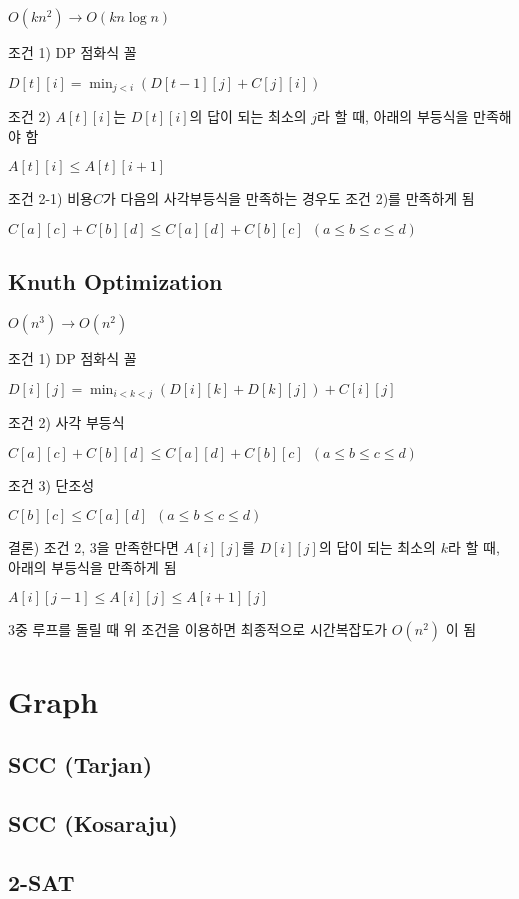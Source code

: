 \documentclass[10pt,landscape,a4paper,twocolumn]{article}
\begin{document}
$O(kn^{2}) \to O(kn\log{n})$

조건 1) DP 점화식 꼴

$D[t][i] = \min_{j<i}( D[t-1][j] + C[j][i] )$

조건 2) $A[t][i]$는 $D[t][i]$의 답이 되는 최소의 $j$라 할 때, 아래의 부등식을 만족해야 함

$A[t][i] \leq A[t][i+1]$

조건 2-1) 비용$C$가 다음의 사각부등식을 만족하는 경우도 조건 2)를 만족하게 됨

$C[a][c] + C[b][d] \leq C[a][d] + C[b][c] \phantom{1} (a \leq b \leq c \leq d)$

\subsection{Knuth Optimization}

$O(n^{3}) \to O(n^{2})$

조건 1) DP 점화식 꼴

$D[i][j] = \min_{i<k<j}( D[i][k] + D[k][j] ) + C[i][j]$

조건 2) 사각 부등식

$C[a][c] + C[b][d] \leq C[a][d] + C[b][c] \phantom{1} (a \leq b \leq c \leq d)$

조건 3) 단조성

$C[b][c] \leq C[a][d] \phantom{1} (a \leq b \leq c \leq d)$

결론) 조건 2, 3을 만족한다면  $A[i][j]$를 $D[i][j]$의 답이 되는 최소의 $k$라 할 때, 아래의 부등식을 만족하게 됨

$A[i][j-1] \leq A[i][j] \leq A[i+1][j]$

3중 루프를 돌릴 때 위 조건을 이용하면 최종적으로 시간복잡도가 $O(n^{2})$ 이 됨

\section{Graph}

\subsection{SCC (Tarjan)}


\subsection{SCC (Kosaraju)}


\subsection{2-SAT}
\end{document}
